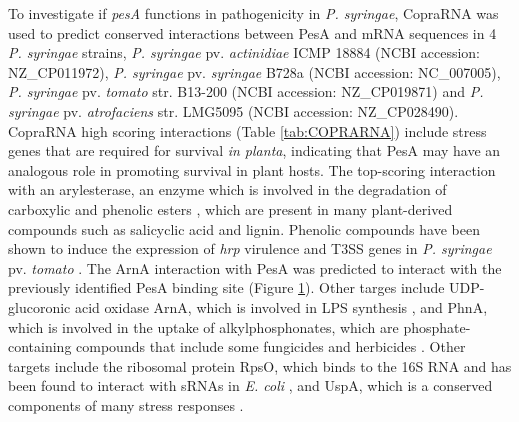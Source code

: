 \begin{figure}
    \label{fig:copraRNA}
\end{figure}To investigate if \textit{pesA} functions in pathogenicity in \textit{P. syringae}, CopraRNA \citep{Wright2014-vh,Wright2013-cc} was used to predict conserved interactions between PesA and mRNA sequences in 4 \textit{P. syringae} strains, \textit{P. syringae} pv. \textit{actinidiae} ICMP 18884 (NCBI accession: NZ\_CP011972), \textit{P. syringae} pv. \textit{syringae} B728a (NCBI accession: NC\_007005), 
\textit{P. syringae} pv. \textit{tomato} str. B13-200 (NCBI accession: NZ\_CP019871) and \textit{P. syringae} pv. \textit{atrofaciens} str. LMG5095 (NCBI accession: NZ\_CP028490). CopraRNA high scoring interactions (Table \ref{tab:COPRARNA}) include stress genes that are required for survival \textit{in planta}, indicating that PesA may have an analogous role in promoting survival in plant hosts. The top-scoring interaction with an arylesterase, an enzyme which is involved in the degradation of carboxylic and phenolic esters \citep{Wang2010-fs}, which are present in many plant-derived compounds such as salicyclic acid and lignin. Phenolic compounds have been shown to induce the expression of \textit{hrp} virulence and T3SS genes in \textit{P. syringae} pv. \textit{tomato} \citep{Lee2015-ub}. The ArnA interaction with PesA was predicted to interact with the previously identified PesA binding site (Figure \ref{fig:copraRNA}). Other targes include UDP-glucoronic acid oxidase ArnA, which is involved in LPS synthesis \citep{Breazeale2002-cd}, and PhnA, which is involved in the uptake of alkylphosphonates, which are phosphate-containing compounds that include some fungicides and herbicides \citep{Chen1990-ql}. Other targets include the ribosomal protein RpsO, which binds to the 16S RNA and has been found to interact with sRNAs in \textit{E. coli} \citep{Fontaine2016-go}, and UspA, which is a conserved components of many stress responses \citep{Kvint2003-kg}.



